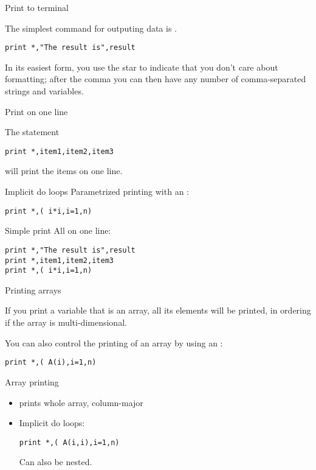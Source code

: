  {Print to terminal}

The simplest command for outputing data is .
\begin{verbatim}
print *,"The result is",result
\end{verbatim}
In its easiest form, you use the star to indicate that you don't care
about formatting; after the comma you can then have any number of
comma-separated strings and variables.

 {Print on one line}

The statement
\begin{verbatim}
print *,item1,item2,item3
\end{verbatim}
will print the items on one line.

\begin{block}{Implicit do loops}
  \label{sl:print-implicit-loop}
  Parametrized printing with an :
\begin{verbatim}
print *,( i*i,i=1,n)
\end{verbatim}
\end{block}

\begin{slide}{Simple print}
  \label{sl:fio-print}
  All on one line:
\begin{verbatim}
print *,"The result is",result
print *,item1,item2,item3
print *,( i*i,i=1,n)  
\end{verbatim}
\end{slide}

 {Printing arrays}

If you print a variable that is an array, all its elements will be
printed, in  ordering if the array is
multi-dimensional.

You can also control the printing of an array by using an
:
\begin{verbatim}
print *,( A(i),i=1,n)
\end{verbatim}

\begin{slide}{Array printing}
  \label{sl:fprint-array}
  \begin{itemize}
  \item {} prints whole array, column-major
  \item Implicit do loops:
\begin{verbatim}
print *,( A(i,i),i=1,n)
\end{verbatim}
  Can also be nested.
  \end{itemize}
\end{slide}


